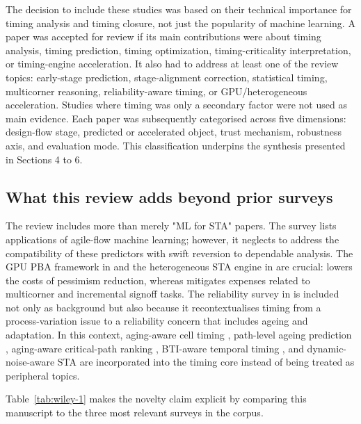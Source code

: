 \documentclass[num-refs]{wiley-article}
\begin{document}
  The decision to include these studies was based on their technical importance for timing analysis and timing closure, not just the popularity of machine learning. A paper was accepted for review if its main contributions were about timing analysis, timing prediction, timing optimization, timing-criticality interpretation, or timing-engine acceleration. It also had to address at least one of the review topics: early-stage prediction, stage-alignment correction, statistical timing, multicorner reasoning, reliability-aware timing, or GPU/heterogeneous acceleration. Studies where timing was only a secondary factor were not used as main evidence. Each paper was subsequently categorised across five dimensions: design-flow stage, predicted or accelerated object, trust mechanism, robustness axis, and evaluation mode. This classification underpins the synthesis presented in Sections 4 to 6.


  \subsection{What this review adds beyond prior surveys}

  The review includes more than merely "ML for STA" papers. The survey \cite{ref20} lists applications of agile-flow machine learning; however, it neglects to address the compatibility of these predictors with swift reversion to dependable analysis. The GPU PBA framework in \cite{ref21} and the heterogeneous STA engine in \cite{ref22} are crucial: \cite{ref21} lowers the costs of pessimism reduction, whereas \cite{ref22} mitigates expenses related to multicorner and incremental signoff tasks. The reliability survey in \cite{ref39} is included not only as background but also because it recontextualises timing from a process-variation issue to a reliability concern that includes ageing and adaptation. In this context, aging-aware cell timing \cite{ref14}, path-level ageing prediction \cite{ref15}, aging-aware critical-path ranking \cite{ref23}, BTI-aware temporal timing \cite{ref44}, and dynamic-noise-aware STA \cite{ref12} are incorporated into the timing core instead of being treated as peripheral topics.


  Table~\ref{tab:wiley-1} makes the novelty claim explicit by comparing this manuscript to the three most relevant surveys in the corpus.
\end{document}
